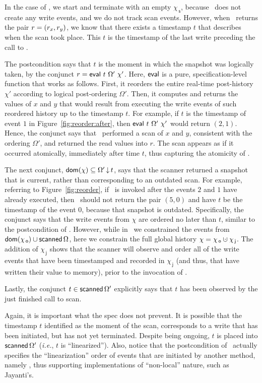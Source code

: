 \documentclass[a4paper,UKenglish]{lipics-v2016}
\newcommand{\ie}{\emph{i.e.}\xspace}
\newcommand{\dom}[1]{\mathsf{dom}(#1)}
\newcommand{\dotcup}{\ensuremath{\mathaccent\cdot\cup}}
\newcommand{\selfsub}{\mathsf{s}}
\newcommand{\othersub}{\mathsf{o}}
\newcommand{\jointsub}{\mathsf{j}}
\newcommand{\hist}{\chi}
\newcommand{\histS}{\hist_{\, \selfsub}}
\newcommand{\histO}{\hist_{\, \othersub}}
\newcommand{\histJ}{\hist_{\, \jointsub}}
\newcommand{\hunion}{\mathbin{\dotcup}}
\newcommand{\stableorder}{\Omega}
\newcommand{\stableorderP}{\stableorder'}
\newcommand{\histP}{\chi'}
\theoremstyle{definition}
\begin{document}
In the case of \jyscan, we start and terminate with an empty $\histS$,
because \jyscan\ does not create any write events, and we do not track
scan events. However, when \jyscan\ returns the pair $r = (r_x,
r_y)$, we know that there exists a timestamp $t$ that describes when
the scan took place. This $t$ is the timestamp of the last write
preceding the call to \jyscan.

The postcondition says that $t$ is the moment in which the snapshot
was logically taken, by the conjunct $r =
\eval\ t\ \stableorderP\ \histP$.  Here, $\mathsf{eval}$ is a pure,
specification-level function that works as follows. First, it reorders
the entire real-time post-history $\histP$ according to logical
post-ordering $\stableorderP$. Then, it computes and returns the
values of $x$ and $y$ that would result from executing the write
events of such reordered history up to the timestamp $t$. For example,
if $t$ is the timestamp of event $1$ in
Figure~\ref{fig:reorder:after}, then $\eval\ t\ \stableorderP\ \histP$
would return $(2, 1)$. Hence, the conjunct says that
\jyscan\ performed a scan of $x$ and $y$, consistent with the ordering
$\stableorderP$, and returned the read values into $r$. The scan
appears as if it occurred atomically, immediately after time $t$, thus
capturing the atomicity of \jyscan.

The next conjunct, $\dom{\hist} \subseteq \ideal{\stableorderP}{t}$,
says that the scanner returned a snapshot that is current, rather than
corresponding to an outdated scan. For example, referring to
Figure~\ref{fig:reorder}, if \jyscan\ is invoked after the events $2$
and $1$ have already executed, then \jyscan\ should not return the
pair $(5, 0)$ and have $t$ be the timestamp of the event $0$, because
that snapshot is outdated. Specifically, the conjunct says that the
write events from $\hist$ are ordered no later than $t$, similar to
the postcondition of \jywrite. However, while in \jywrite\ we
constrained the events from $\dom{\histO} \cup \scanned\stableorder$,
here we constrain the full global history $\hist = \histO \hunion
\histJ$. The addition of $\histJ$ shows that the scanner will observe
and order all of the write events that have been timestamped and
recorded in $\histJ$ (and thus, that have written their value to
memory), prior to the invocation of \jyscan.

Lastly, the conjunct $t \in \scanned\stableorderP$ explicitly says
that $t$ has been observed by the just finished call to scan.

Again, it is important what the spec does not prevent. It is possible
that the timestamp $t$ identified as the moment of the scan,
corresponds to a write that has been initiated, but has not yet terminated.
Despite being ongoing, $t$ is placed into $\scanned\stableorderP$
(\ie, $t$ is ``linearized''). Also, notice that the postcondition of
\jyscan\ actually specifies the ``linearization'' order of events that
are initiated by another method, namely \jywrite, thus supporting
implementations of ``non-local'' nature, such as Jayanti's.
\end{document}
